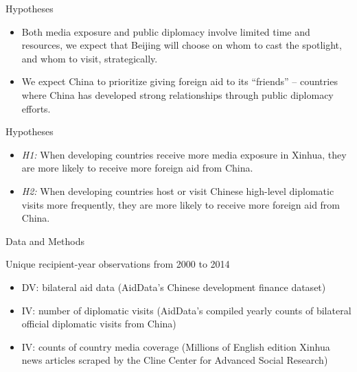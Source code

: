 \documentclass{beamer}
\begin{document}


\begin{frame}{Hypotheses}

\begin{itemize}

\item Both media exposure and public diplomacy involve limited time and resources,
we expect that Beijing will choose on whom to cast the spotlight, and whom to visit,
strategically. 

\item We expect China to prioritize giving foreign
aid to its “friends” -- countries where China has developed strong relationships through
public diplomacy efforts.

\end{itemize}

\end{frame}


\begin{frame}{Hypotheses} 

\begin{itemize} 
    \item \textit{H1:} When developing countries receive more media exposure in Xinhua, they are more
likely to receive more foreign aid from China.
    \item \textit{H2:} When developing countries host or visit Chinese high-level diplomatic visits more
frequently, they are more likely to receive more foreign aid from China.
\end{itemize}

\end{frame}




\begin{frame}{Data and Methods}

Unique recipient-year observations from 2000 to 2014

\begin{itemize} 

\item DV: bilateral aid data (AidData’s Chinese development finance dataset)

\item IV: number of diplomatic visits (AidData’s compiled yearly counts of bilateral official
diplomatic visits from China)

\item IV: counts of country media coverage (Millions of English edition Xinhua news articles scraped by the Cline Center for Advanced Social Research)


\end{itemize}

\end{frame}
\end{document}
